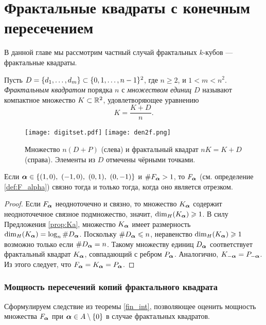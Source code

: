 \newpage
\chapter{Фрактальные квадраты с конечным пересечением}

В данной главе мы рассмотрим частный случай фрактальных $k$-кубов --- фрактальные квадраты.

\begin{definition}\label{dfn:FS} 
Пусть $D=\{d_1,\ldots,d_m\}\subset\{0,1,\ldots,n-1\}^2$, где $n\ge 2$, и $1<m<n^2$.
{\em Фрактальным квадратом} порядка $n$ с {\em множеством единиц $D$} называют компактное множество $K\subset\mathbb{R}^2$, удовлетворяющее уравнению
$$
K=\dfrac{K+D}{n}.
$$
\end{definition}

\begin{figure}[h]
 \centering
 \texttt{[image: digitset.pdf]}
 \hfill
 \texttt{[image: den2f.png]}
 \caption{Множество $n(D+P)$ (слева) и фрактальный квадрат $nK=K+D$ (справа). Элементы из $D$ отмечены чёрными точками.}
 \label{fig:fr_sq}
\end{figure}


\begin{corollary}
Если $\bma\in\{(1,0),\ (-1,0),\ (0,1),\ (0,-1)\}$ и $\#F_{\bm{\alpha}}>1$, то $F_{\bm{\alpha}}$ (см. определение \ref{def:F_alpha}) связно тогда и только тогда, когда оно является отрезком.
\end{corollary}

\begin{proof}
Если $F_{\bm{\alpha}}$ неодноточечно и связно, то множество $K_{{\bm{\alpha}}}$ содержит неодноточечное связное подмножество, значит, $\dim_H(K_{{\bm{\alpha}}})\geqslant1$.
В силу Предложения \ref{prop:Ka}, множество $K_{{\bm{\alpha}}}$ имеет размерность $\dim_H(K_{{\bm{\alpha}}})=\log_n\#D_{{\bm{\alpha}}}$.
Поскольку $\#D_{{\bm{\alpha}}}\leqslant n$, неравенство $\dim_H(K_{{\bm{\alpha}}})\geqslant1$ возможно только если $\#D_{{\bm{\alpha}}}= n$.
Такому множеству единиц $D_{{\bm{\alpha}}}$ соответствует фрактальный квадрат $K_{{\bm{\alpha}}}$, совпадающий с ребром $P_{{\bm{\alpha}}}$.
Аналогично, $K_{-{\bm{\alpha}}}=P_{-{\bm{\alpha}}}$.
Из этого следует, что $F_{\bm{\alpha}}=K_{{\bm{\alpha}}}=P_{{\bm{\alpha}}}$.
\end{proof}


\subsection{Мощность пересечений копий фрактального квадрата}

Сформулируем следствие из теоремы \ref{fin_int}, позволяющее оценить мощность множества $F_{\bm{\alpha}}$ при ${\bm{\alpha}}\in A\setminus\{0\}$ в случае фрактальных квадратов.

